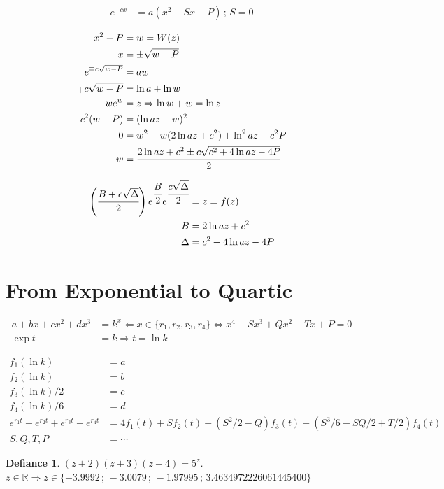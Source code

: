 \documentclass[12pt,a4paper]{article}
\newtheorem{defy}{Defiance}
\begin{document}
\begin{align}
  e^{-cx} &= a(x^2 - Sx + P)\,;\,S = 0
\end{align}

\begin{align}
  x^2 - P &= w = W(z) \\
  x &= \pm \sqrt{w - P} \\
  e^{\mp c\sqrt{w - P}} &= aw \\
  \mp c\sqrt{w - P} &= \ln a + \ln w \\
  w e^w &= z \Rightarrow \ln w + w = \ln z \\
  c^2 (w - P) &= (\ln az - w)^2 \\
  0 &= w^2 - w(2 \ln az + c^2) + \ln^2 az + c^2 P \\
  w &= \cfrac{2 \ln az + c^2 \pm c \sqrt{c^2 + 4\ln az - 4 P}}{2}
\end{align}

\begin{align}
  \left( \cfrac{B + c \sqrt{\Delta}}{2} \right) e^{\cfrac{B}{2}} e^{\cfrac{c \sqrt{\Delta}}{2}} &= z = f(z) \\
  B &= 2 \ln az + c^2 \\
  \Delta &= c^2 + 4\ln az - 4 P
\end{align}

\section{From Exponential to Quartic}

\begin{align}
a + bx + cx^2 + dx^3 &= k^x \Leftarrow x \in \{ r_1, r_2, r_3, r_4 \} \Leftrightarrow x^4 - Sx^3 + Qx^2 - Tx + P = 0 \\
\exp t &= k \Rightarrow t = \ln k
\end{align}

\begin{align}
f_1(\ln k) &= a \\
f_2(\ln k) &= b \\
f_3(\ln k)/2 &= c \\
f_4(\ln k)/6 &= d \\
e^{r_1 t} + e^{r_2 t} + e^{r_3 t}  + e^{r_4 t} &= 4 f_1(t) + S f_2(t) + (S^2/2 - Q) f_3(t) + (S^3/6 - SQ/2 + T/2) f_4(t) \\
S, Q, T, P &= \cdots \nonumber
\end{align}

\begin{defy}
$(z + 2)(z + 3)(z + 4) = 5^z$. \\
$z \in \mathbb{R} \Rightarrow z \in \{ -3.9992\,;\,-3.0079\,;\,-1.97995\,;\,3.4634972226061445400 \}$
\end{defy}
\end{document}
